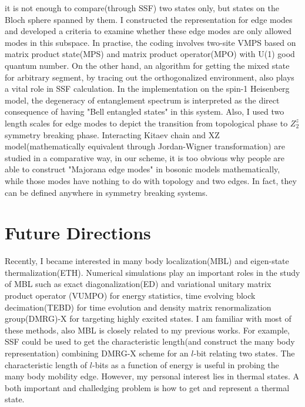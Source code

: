\documentclass[a4paper]{article}
\newcommand{\<}{\langle}
\renewcommand{\>}{\rangle}
\begin{document}
it is not enough to compare(through SSF) two states only, but states on the Bloch sphere spanned by them.
I constructed the representation for edge modes and developed a criteria to examine whether these edge modes are only allowed modes in this subspace.
In practise, the coding involves two-site VMPS based on matrix product state(MPS) and matrix product operator(MPO) with U(1) good quantum number.
On the other hand, an algorithm for getting the mixed state for arbitrary segment, by tracing out the orthogonalized environment, also plays a vital role in SSF calculation.
In the implementation on the spin-1 Heisenberg model,
the degeneracy of entanglement spectrum\cite{Pollmann2010} is interpreted as the direct consequence of having "Bell entangled states" in this system.
Also, I used two length scales for edge modes to depict the transition from topological phase to $Z_2^z$ symmetry breaking phase.
Interacting Kitaev chain and XZ model(mathematically equivalent through Jordan-Wigner transformation) are studied in a comparative way,
in our scheme, it is too obvious why people are able to construct "Majorana edge modes"\cite{Vishveshwara2011,*Bardyn2012,*Zvyagin2013} in bosonic models mathematically,
while those modes have nothing to do with topology and two edges.
In fact, they can be defined anywhere in symmetry breaking systems.

\section{Future Directions}\label{proposal}
Recently, I became interested in many body localization(MBL) and eigen-state thermalization(ETH).
Numerical simulations play an important roles in the study of MBL such as
exact diagonalization(ED) and variational unitary matrix product operator (VUMPO)\cite{Pollmann2016} for energy statistics,
time evolving block decimation(TEBD) for time evolution and density matrix renormalization group(DMRG)-X\cite{Khemani2016} for targeting highly excited states.
I am familiar with most of these methods, also MBL is closely related to my previous works.
For example, SSF could be used to get the characteristic length(and construct the many body representation) combining DMRG-X scheme for an $l$-bit relating two states.
The characteristic length of $l$-bits as a function of energy is useful in probing the many body mobility edge.
However, my personal interest lies in thermal states.
A both important and challedging problem is how to get and represent a thermal state.
\end{document}
